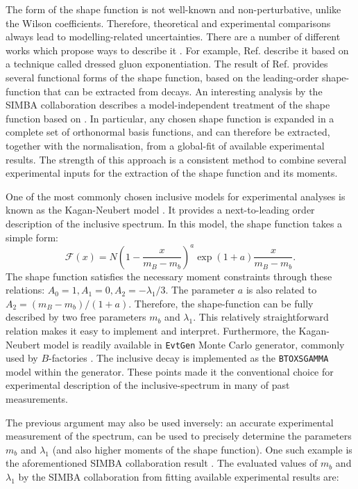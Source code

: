 The form of the shape function is not well-known and non-perturbative, unlike the Wilson coefficients.
Therefore, theoretical and experimental comparisons always lead to modelling-related uncertainties.
There are a number of different works which propose ways to describe it \cite{Benson:2004sg,Lange:2005yw,Andersen:2005mj,Gambino:2007rp,Aglietti:2007ik,Bernlochner:2020jlt}.
For example, Ref. \cite{Andersen:2005mj} describe it based on a technique called dressed gluon exponentiation.
The result of Ref. \cite{Lange:2005yw} provides several functional forms of the shape function, based on the leading-order shape-function that can be extracted from \BtoXsgamma decays.
An interesting analysis by the SIMBA collaboration \cite{Bernlochner:2020jlt} describes a model-independent treatment of the shape function based on .
In particular, any chosen shape function is expanded in a complete set of orthonormal basis functions, and can therefore be extracted, together with the normalisation, from a global-fit of available experimental results.
The strength of this approach is a consistent method to combine several experimental inputs for the extraction of the shape function and its moments.

One of the most commonly chosen inclusive \BtoXsgamma models for experimental analyses is known as the Kagan-Neubert model \cite{Kagan:1998ym}.
It provides a next-to-leading order description of the inclusive \BtoXsgamma spectrum. 
In this model, the shape function takes a simple form:
\begin{equation}
    \mathcal{F}(x) = N\left(1-\frac{x}{m_B-m_b}\right)^a\exp{(1+a)\frac{x}{m_B-m_b}}.
\end{equation}
The shape function satisfies the necessary moment constraints through these relations: $A_0=1,A_1 = 0,A_2=-\lambda_1/3$.
The parameter $a$ is also related to $A_2=(m_B-m_b)/(1+a)$.
Therefore, the shape-function can be fully described by two free parameters $m_b$ and $\lambda_1$.
This relatively straightforward relation makes it easy to implement and interpret.
Furthermore, the Kagan-Neubert model is readily available in \texttt{EvtGen} Monte Carlo generator, commonly used by $B$-factories \cite{Ryd:2005zz}.
The \BtoXsgamma inclusive decay is implemented as the \texttt{BTOXSGAMMA} model within the generator. 
These points made it the conventional choice for experimental description of the inclusive-\Egamma spectrum in many of past measurements.

The previous argument may also be used inversely: an accurate experimental measurement of the \BtoXsgamma spectrum, can be used to precisely determine the parameters $m_b$ and $\lambda_1$ (and also higher moments of the shape function).
One such example is the aforementioned SIMBA collaboration result \cite{Bernlochner:2020jlt}.
The evaluated values of $m_b$ and $\lambda_1$ by the SIMBA collaboration from fitting available \BtoXsgamma experimental results are:

